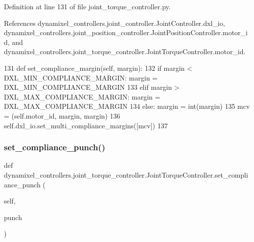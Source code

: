 Definition at line 131 of file joint\+\_\+torque\+\_\+controller.\+py.



References dynamixel\+\_\+controllers.\+joint\+\_\+controller.\+Joint\+Controller.\+dxl\+\_\+io, dynamixel\+\_\+controllers.\+joint\+\_\+position\+\_\+controller.\+Joint\+Position\+Controller.\+motor\+\_\+id, and dynamixel\+\_\+controllers.\+joint\+\_\+torque\+\_\+controller.\+Joint\+Torque\+Controller.\+motor\+\_\+id.


\begin{DoxyCode}
131     \textcolor{keyword}{def }set\_compliance\_margin(self, margin):
132         \textcolor{keywordflow}{if} margin < DXL\_MIN\_COMPLIANCE\_MARGIN: margin = DXL\_MIN\_COMPLIANCE\_MARGIN
133         \textcolor{keywordflow}{elif} margin > DXL\_MAX\_COMPLIANCE\_MARGIN: margin = DXL\_MAX\_COMPLIANCE\_MARGIN
134         \textcolor{keywordflow}{else}: margin = int(margin)
135         mcv = (self.motor\_id, margin, margin)
136         self.dxl\_io.set\_multi\_compliance\_margins([mcv])
137 
\end{DoxyCode}
\mbox{\label{classdynamixel__controllers_1_1joint__torque__controller_1_1_joint_torque_controller_a317a410b656b15c5b0066622a8991f11}} 
\subsubsection{\texorpdfstring{set\+\_\+compliance\+\_\+punch()}{set\_compliance\_punch()}}
{\footnotesize\ttfamily def dynamixel\+\_\+controllers.\+joint\+\_\+torque\+\_\+controller.\+Joint\+Torque\+Controller.\+set\+\_\+compliance\+\_\+punch (\begin{DoxyParamCaption}\item[{}]{self,  }\item[{}]{punch }\end{DoxyParamCaption})}



